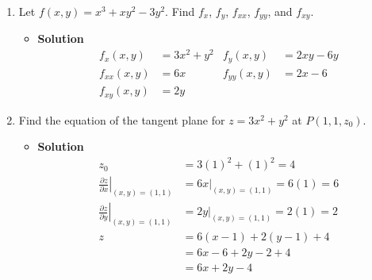 \documentclass[12pt, A4]{article}
\newcommand{\pder}[2]{\frac{\partial #1}{\partial #2}}
\begin{document}
\begin{enumerate}[1)]
			\item
				Let $f(x, y) = x^3 + xy^2 - 3y^2$. Find $f_x$, $f_y$, $f_{xx}$, $f_{yy}$, and $f_{xy}$.
				\begin{itemize}
					\item[] \textbf{Solution}
						\begin{align*}
							f_x(x, y) &= 3x ^2 + y^2 &
									f_y(x, y) &= 2xy - 6y \\
							f_{xx}(x, y) &= 6x &
									f_{yy}(x, y) &= 2x - 6 \\
							f_{xy}(x, y) &= 2y
						\end{align*}
				\end{itemize}
			\item
				Find the equation of the tangent plane for $z = 3x^2 + y^2$ at $P(1, 1, z_0)$.
				\begin{itemize}[ ]
					\item \textbf{Solution}
						\begin{align*}
							z_0 &= 3(1)^2 + (1)^2
									= 4 \\
							\left.\pder{z}{x}\right|_{(x, y) = (1, 1)} &= 6x|_{(x, y) = (1, 1)} 
									= 6(1) 
									= 6 \\
							\left.\pder{z}{y}\right|_{(x, y) = (1, 1)} &= 2y|_{(x, y) = (1, 1)}
									= 2(1)
									= 2 \\
							z &= 6(x - 1) + 2(y - 1) + 4 \\
								&= 6x - 6 + 2y - 2 + 4 \\
								&= 6x + 2y - 4
						\end{align*}
				\end{itemize}
		\end{enumerate}
\end{document}
